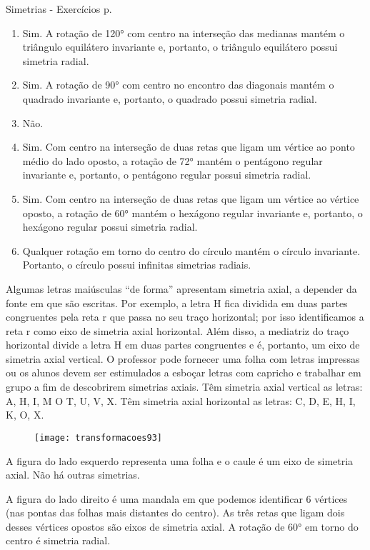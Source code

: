 \begin{sugestions}{Simetrias - Exercícios p. \pageref{transformacoes-exercise4}}
{
\begin{enumerate}[label=\textit{\alph*)}, itemsep=2pt]
\item Sim. A rotação de 120° com centro na interseção das medianas mantém o triângulo equilátero invariante e, portanto, o triângulo equilátero possui simetria radial.
\item Sim. A rotação de 90° com centro no encontro das diagonais mantém o quadrado invariante e, portanto, o quadrado possui simetria radial. 
\item Não.
\item Sim. Com centro na interseção de duas retas que ligam um vértice ao ponto médio do lado oposto, a rotação de 72° mantém o pentágono regular invariante e, portanto, o pentágono regular possui simetria radial.
\item Sim. Com centro na interseção de duas retas que ligam um vértice ao vértice oposto, a rotação de 60° mantém o hexágono regular invariante e, portanto, o hexágono regular possui simetria radial. 
\item Qualquer rotação em torno do centro do círculo mantém o círculo invariante. Portanto, o círculo possui infinitas simetrias radiais.
\end{enumerate}

 Algumas letras maiúsculas “de forma” apresentam simetria axial, a depender da fonte em que são escritas. Por exemplo, a letra H fica dividida em duas partes congruentes pela reta r que passa no seu traço horizontal; por isso identificamos a reta r como eixo de simetria axial horizontal.  Além disso, a mediatriz do traço horizontal divide a letra H em duas partes congruentes e é, portanto, um eixo de simetria axial vertical.  O professor pode fornecer uma folha com letras impressas ou os alunos devem ser estimulados a esboçar letras com capricho e trabalhar em grupo a fim de descobrirem simetrias axiais. Têm simetria axial vertical as letras: A, H, I, M O T, U, V, X. Têm simetria axial horizontal as letras: C, D, E, H, I, K, O, X.

 \begin{figure}[H]
 \centering
 
 \texttt{[image: transformacoes93]}
 \end{figure}

A figura do lado esquerdo representa uma folha e o caule é um eixo de simetria axial. Não há outras simetrias.

A figura do lado direito é uma mandala em que podemos identificar 6 vértices (nas pontas das folhas mais distantes do centro). As três retas que ligam dois desses vértices opostos são eixos de simetria axial. A rotação de 60° em torno do centro é simetria radial.  


}
\end{sugestions}
